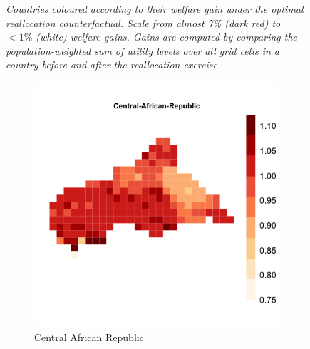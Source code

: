 \documentclass[11pt, oneside]{article}   	%
\newcommand{\mysubcaption}[1]{
\justify
\begin{spacing}{0.7}
\textit{\footnotesize #1}
\end{spacing}}
\begin{document}
\begin{figure}[!ph]
\label{fig:countries_by_welfare_gain}
\mysubcaption{Countries coloured according to their welfare gain under the optimal reallocation counterfactual. Scale from almost 7\% (dark red) to $<1\%$ (white) welfare gains. Gains are computed by comparing the population-weighted sum of utility levels over all grid cells in a country before and after the reallocation exercise.}
\end{figure}
\clearpage

\vspace*{\fill}
\begin{figure}[!ph]
\centering
\caption{Spatial distribution of $\Lambda_{i}$ for sample countries}

\begin{subfigure}[c]{0.32\textwidth}
\includegraphics[width=\textwidth]{../../Analysis/output/zeta_heatmaps/Central-African-Republic_zeta.png}
\caption{Central African Republic}
\label{fig:Central African Republic_zeta}
\end{subfigure}
\begin{subfigure}[c]{0.32\textwidth}

\end{subfigure}
\end{figure}
\end{document}
